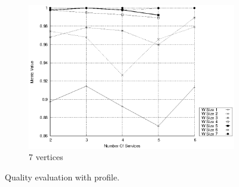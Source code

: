 \begin{figure}[h]
\begin{subfigure}{0.33\textwidth}
    \includegraphics[width=\textwidth]{Images/graphs/window_quality_performance_diff_qual_n7_s7_20_100_n7}
    \caption{7 vertices}
    \label{fig:quality_window_wide_qualitative_n7}
  \end{subfigure}

  \caption{ Quality evaluation with \wide profile.}
  \label{fig:quality_window_wide_qualitative}
\end{figure}

